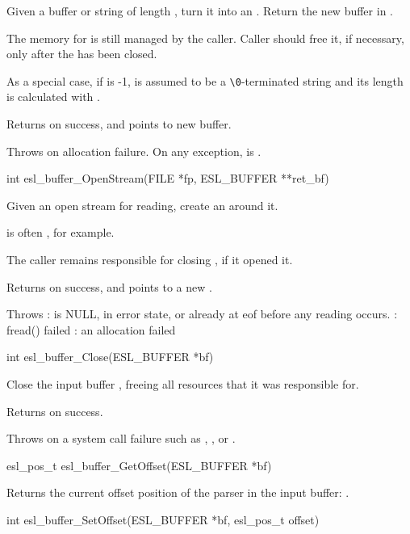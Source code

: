 \begin{sreapi}
Given a buffer or string  of length , turn it into
an . Return the new buffer in .

The memory for  is still managed by the caller. 
Caller should free it, if necessary, only after the 
 has been closed. 

As a special case, if  is -1,  is assumed to be a
\verb+\0+-terminated string and its length is calculated with
.

Returns  on success, and  points to new buffer.

Throws  on allocation failure.
On any exception,  is .


\hypertarget{func:esl_buffer_OpenStream()}
{\item[int esl\_buffer\_OpenStream(FILE *fp, ESL\_BUFFER **ret\_bf)]}

Given an open stream  for reading, create an
 around it.

 is often , for example.

The caller remains responsible for closing , if it
opened it. 

Returns  on success, and  points to a new .

Throws :  is NULL, in error state, or already at eof before any reading occurs.
 : fread() failed
 : an allocation failed


\hypertarget{func:esl_buffer_Close()}
{\item[int esl\_buffer\_Close(ESL\_BUFFER *bf)]}

Close the input buffer , freeing all resources that it
was responsible for.

Returns  on success.

Throws  on a system call failure such as , , or .



\hypertarget{func:esl_buffer_GetOffset()}
{\item[esl\_pos\_t esl\_buffer\_GetOffset(ESL\_BUFFER *bf)]}

Returns the current offset position of the parser
in the input buffer: .


\hypertarget{func:esl_buffer_SetOffset()}
{\item[int esl\_buffer\_SetOffset(ESL\_BUFFER *bf, esl\_pos\_t offset)]}


\end{sreapi}

